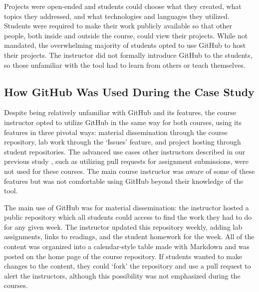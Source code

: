 Projects were open-ended and students could choose what they created, what topics they addressed, and what technologies and languages they utilized. Students were required to make their work publicly available so that other people, both inside and outside the course, could view their projects. While not mandated, the overwhelming majority of students opted to use GitHub to host their projects. The instructor did not formally introduce GitHub to the students, so those unfamiliar with the tool had to learn from others or teach themselves.

\subsection{How GitHub Was Used During the Case Study}
Despite being relatively unfamiliar with GitHub and its features, the course instructor opted to utilize GitHub in the same way for both courses, using its features in three pivotal ways: material dissemination through the course repository, lab work through the `Issues' feature, and project hosting through student repositories. The advanced use cases other instructors described in our previous study \cite{zagalsky2015emergence}, such as utilizing pull requests for assignment submissions, were not used for these courses. The main course instructor was aware of some of these features but was not comfortable using GitHub beyond their knowledge of the tool.

The main use of GitHub was for material dissemination: the instructor hosted a public repository which all students could access to find the work they had to do for any given week. The instructor updated this repository weekly, adding lab assignments, links to readings, and the student homework for the week. All of the content was organized into a calendar-style table made with Markdown and was posted on the home page of the course repository. If students wanted to make changes to the content, they could `fork' the repository and use a pull request to alert the instructors, although this possibility was not emphasized during the courses.

